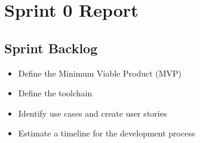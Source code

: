 
\section{Sprint 0 Report}
\subsection{Sprint Backlog}
    \begin{itemize}
        \item Define the Minimum Viable Product (MVP)
        \item Define the toolchain
        \item Identify use cases and create user stories
        \item Estimate a timeline for the development process
    \end{itemize}

